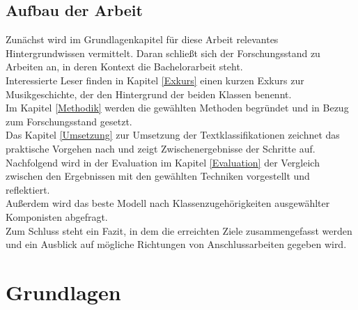 \documentclass[ngerman]{ttlab-qualify}
\begin{document}
\section{Aufbau der Arbeit}
Zunächst wird im Grundlagenkapitel für diese Arbeit relevantes Hintergrundwissen vermittelt. Daran schließt sich der Forschungsstand zu Arbeiten an, in deren Kontext die Bachelorarbeit steht.\\
Interessierte Leser finden in Kapitel \ref{Exkurs} einen kurzen Exkurs zur Musikgeschichte, der den Hintergrund der beiden Klassen benennt.\\ Im Kapitel \ref{Methodik} werden die gewählten Methoden begründet und in Bezug zum Forschungsstand gesetzt.
\\Das Kapitel \ref{Umsetzung} zur Umsetzung der Textklassifikationen zeichnet das praktische Vorgehen nach und zeigt Zwischenergebnisse der Schritte auf.\\ 
Nachfolgend wird in der Evaluation im Kapitel \ref{Evaluation} der Vergleich zwischen den Ergebnissen mit den gewählten Techniken vorgestellt und reflektiert.\\ Außerdem wird das beste Modell nach Klassenzugehörigkeiten ausgewählter Komponisten abgefragt.\\
Zum Schluss steht ein Fazit, in dem die erreichten Ziele zusammengefasst werden und ein Ausblick auf mögliche Richtungen von Anschlussarbeiten gegeben wird.
\chapter{Grundlagen} \label{Grundlagen}
\end{document}
